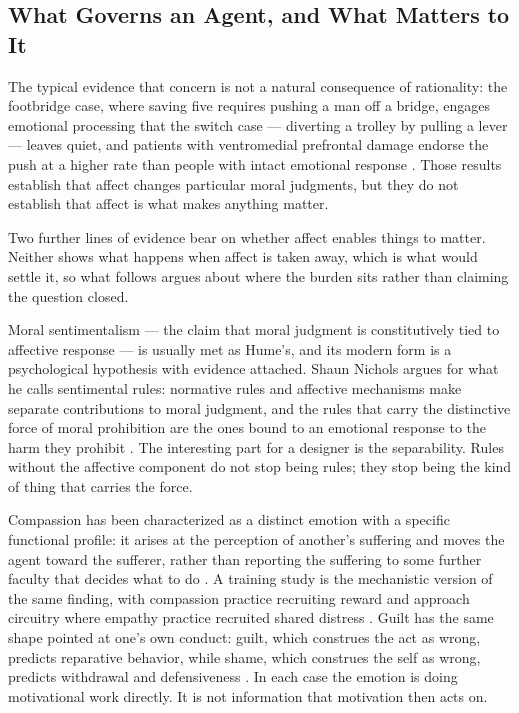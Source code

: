 \subsection{What Governs an Agent, and What Matters to It}
\label{sec:2.2.2}
The typical evidence that concern is not a natural consequence of rationality: the footbridge case, where saving five requires pushing a man off a bridge, engages emotional processing that the switch case — diverting a trolley by pulling a lever — leaves quiet, and patients with ventromedial prefrontal damage endorse the push at a higher rate than people with intact emotional response \autocite{greene2001fmri,koenigs2007damage}. Those results establish that affect changes particular moral judgments, but they do not establish that affect is what makes anything matter.

Two further lines of evidence bear on whether affect enables things to matter. Neither shows what happens when affect is taken away, which is what would settle it, so what follows argues about where the burden sits rather than claiming the question closed.

Moral sentimentalism — the claim that moral judgment is constitutively tied to affective response — is usually met as Hume's, and its modern form is a psychological hypothesis with evidence attached. Shaun Nichols argues for what he calls sentimental rules: normative rules and affective mechanisms make separate contributions to moral judgment, and the rules that carry the distinctive force of moral prohibition are the ones bound to an emotional response to the harm they prohibit \autocite{nichols2004sentimental}. The interesting part for a designer is the separability. Rules without the affective component do not stop being rules; they stop being the kind of thing that carries the force.

Compassion has been characterized as a distinct emotion with a specific functional profile: it arises at the perception of another's suffering and moves the agent toward the sufferer, rather than reporting the suffering to some further faculty that decides what to do \autocite{goetz2010compassion}. A training study is the mechanistic version of the same finding, with compassion practice recruiting reward and approach circuitry where empathy practice recruited shared distress \autocite{klimecki2013differential}. Guilt has the same shape pointed at one's own conduct: guilt, which construes the act as wrong, predicts reparative behavior, while shame, which construes the self as wrong, predicts withdrawal and defensiveness \autocite{tangney2007moral}. In each case the emotion is doing motivational work directly. It is not information that motivation then acts on.

